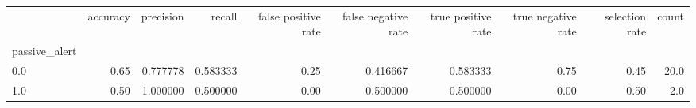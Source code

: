 \begin{tabular}{lrrrrrrrrr}
\toprule
{} &  accuracy &  precision &    recall &  false positive rate &  false negative rate &  true positive rate &  true negative rate &  selection rate &  count \\
passive\_alert &           &            &           &                      &                      &                     &                     &                 &        \\
\midrule
0.0           &      0.65 &   0.777778 &  0.583333 &                 0.25 &             0.416667 &            0.583333 &                0.75 &            0.45 &   20.0 \\
1.0           &      0.50 &   1.000000 &  0.500000 &                 0.00 &             0.500000 &            0.500000 &                0.00 &            0.50 &    2.0 \\
\bottomrule
\end{tabular}
